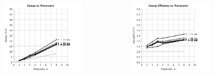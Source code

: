 \documentclass[handout,10pt]{beamer}
\begin{document}
\begin{frame}
\begin{columns}
\begin{minipage}[c][.6\textheight][c]{\linewidth}
	\begin{figure}
	\centering
	\includegraphics[scale = 0.25]{ge_size_2.png}
	\end{figure}
	\vspace{-2em}
	\begin{figure}
	\centering
	\includegraphics[scale = 0.25]{ge_size_1.png}
	\end{figure}
\end{minipage}
\end{columns}
\end{frame}
\end{document}
